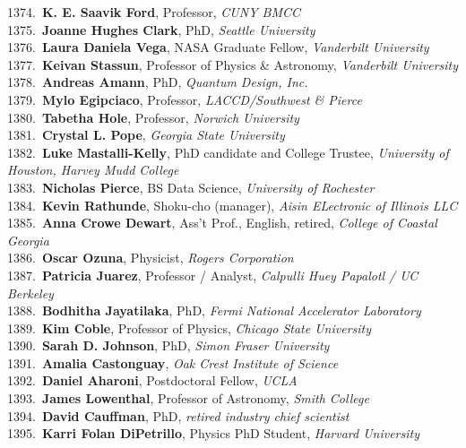 1374.~{\bf K. E. Saavik Ford}, Professor, {\sl CUNY BMCC} \\
1375.~{\bf Joanne Hughes Clark}, PhD, {\sl Seattle University} \\
1376.~{\bf Laura Daniela Vega}, NASA Graduate Fellow, {\sl Vanderbilt University} \\
1377.~{\bf Keivan Stassun}, Professor of Physics \& Astronomy, {\sl Vanderbilt University} \\
1378.~{\bf Andreas Amann}, PhD, {\sl Quantum Design, Inc.} \\
1379.~{\bf Mylo Egipciaco}, Professor, {\sl LACCD/Southwest \& Pierce} \\
1380.~{\bf Tabetha Hole}, Professor, {\sl Norwich University} \\
1381.~{\bf Crystal L. Pope}, {\sl Georgia State University} \\
1382.~{\bf Luke Mastalli-Kelly}, PhD candidate and College Trustee, {\sl University of Houston, Harvey Mudd College} \\
1383.~{\bf Nicholas Pierce}, BS Data Science, {\sl University of Rochester} \\
1384.~{\bf Kevin Rathunde}, Shoku-cho (manager), {\sl Aisin ELectronic of Illinois LLC} \\
1385.~{\bf Anna Crowe Dewart}, Ass't Prof., English, retired, {\sl College of Coastal Georgia} \\
1386.~{\bf Oscar Ozuna}, Physicist, {\sl Rogers Corporation} \\
1387.~{\bf Patricia Juarez}, Professor / Analyst, {\sl Calpulli Huey Papalotl / UC Berkeley} \\
1388.~{\bf Bodhitha Jayatilaka}, PhD, {\sl Fermi National Accelerator Laboratory} \\
1389.~{\bf Kim Coble}, Professor of Physics, {\sl Chicago State University} \\
1390.~{\bf Sarah D. Johnson}, PhD, {\sl Simon Fraser University} \\
1391.~{\bf Amalia Castonguay}, {\sl Oak Crest Institute of Science } \\
1392.~{\bf Daniel Aharoni}, Postdoctoral Fellow, {\sl UCLA} \\
1393.~{\bf James Lowenthal}, Professor of Astronomy, {\sl Smith College} \\
1394.~{\bf David Cauffman}, PhD, {\sl retired industry chief scientist} \\
1395.~{\bf Karri Folan DiPetrillo}, Physics PhD Student, {\sl Harvard University } \\
